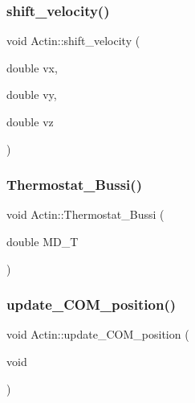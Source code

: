 \subsubsection{\texorpdfstring{shift\_velocity()}{shift\_velocity()}}
{\footnotesize\ttfamily void Actin\+::shift\+\_\+velocity (\begin{DoxyParamCaption}\item[{double}]{vx,  }\item[{double}]{vy,  }\item[{double}]{vz }\end{DoxyParamCaption})\hspace{0.3cm}{\ttfamily [inline]}}

\mbox{\label{classActin_a9e73b09a4cd982adc8a4879d7960d9bf}} 
\subsubsection{\texorpdfstring{Thermostat\_Bussi()}{Thermostat\_Bussi()}}
{\footnotesize\ttfamily void Actin\+::\+Thermostat\+\_\+\+Bussi (\begin{DoxyParamCaption}\item[{double}]{M\+D\+\_\+T }\end{DoxyParamCaption})}

\mbox{\label{classActin_a501f81fc7093ff06593c5549afd1167b}} 
\subsubsection{\texorpdfstring{update\_COM\_position()}{update\_COM\_position()}}
{\footnotesize\ttfamily void Actin\+::update\+\_\+\+C\+O\+M\+\_\+position (\begin{DoxyParamCaption}\item[{void}]{ }\end{DoxyParamCaption})\hspace{0.3cm}{\ttfamily [inline]}}

\mbox{\label{classActin_a2f171e0eab1ee13c538ca25c8cf69aa9}} 
